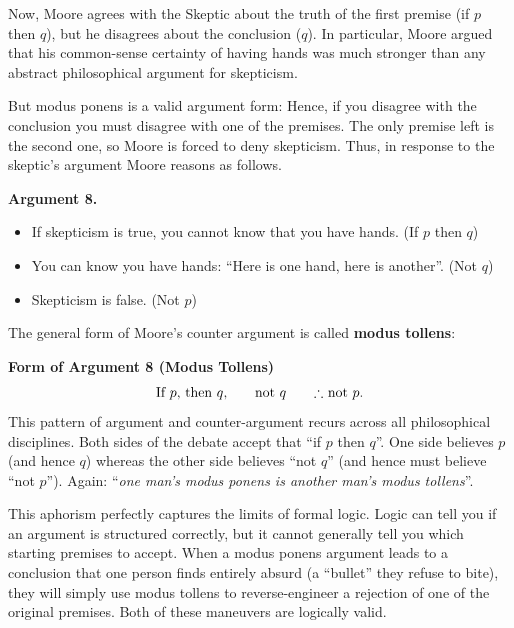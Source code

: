 \documentclass[options]{philosophersimprint}
\theoremstyle{definition}
\begin{document}
Now, Moore agrees with the Skeptic about the truth of the first premise (if $p$ then $q$), but he disagrees about the conclusion ($q$). In particular, Moore argued that his common-sense certainty of having hands was much stronger than any abstract philosophical argument for skepticism.

But modus ponens is a valid argument form: Hence, if you disagree with the conclusion you must disagree with one of the premises. The only premise left is the second one, so Moore is forced to deny skepticism. Thus, in response to the skeptic's argument Moore reasons as follows.

\textbf{Argument 8.}
\begin{itemize}
    \item[] If skepticism is true, you cannot know that you have hands. (If $p$ then $q$)
    \item[] You can know you have hands: ``Here is one hand, here is another''. (Not $q$)
    \item[$\therefore$] Skepticism is false. (Not $p$)
\end{itemize}
The general form of Moore's counter argument is called \textbf{modus tollens}:

\textbf{Form of Argument 8 (Modus Tollens)}
$$\text{If $p$, then $q$,\qquad not $q$\qquad $\therefore$ not $p$.}$$
This pattern of argument and counter-argument recurs across all philosophical disciplines. Both sides of the debate accept that ``if $p$ then $q$''. One side believes $p$ (and hence $q$) whereas the other side believes ``not $q$'' (and hence must believe ``not $p$''). Again: ``\textit{one man's modus ponens is another man's modus tollens}''.

This aphorism perfectly captures the limits of formal logic. Logic can tell you if an argument is structured correctly, but it cannot generally tell you which starting premises to accept. When a modus ponens argument leads to a conclusion that one person finds entirely absurd (a ``bullet'' they refuse to bite), they will simply use modus tollens to reverse-engineer a rejection of one of the original premises. Both of these maneuvers are logically valid.
\end{document}
